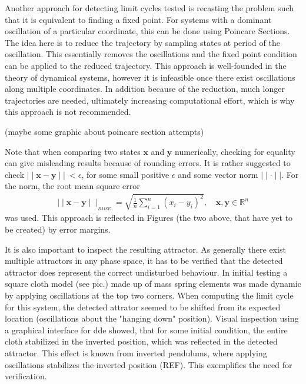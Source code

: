 Another approach for detecting limit cycles tested is recasting the problem such that it is equivalent to finding a fixed point. For systems with a dominant oscillation of a particular coordinate, this can be done using Poincare Sections. The idea here is to reduce the trajectory by sampling states at period of the oscillation. This essentially removes the oscillations and the fixed point condition can be applied to the reduced trajectory. This approach is well-founded in the theory of dynamical systems, however it is infeasible once there exist oscillations along multiple coordinates. In addition because of the reduction, much longer trajectories are needed, ultimately increasing computational effort, which is why this approach is not recommended. 

(maybe some graphic about poincare section attempts)

Note that when comparing two states $\mathbf{x}$ and $\mathbf{y}$ numerically, checking for equality can give misleading results because of rounding errors. It is rather suggested to check $\mid\mid \mathbf{x} - \mathbf{y} \mid\mid\ < \epsilon$, for some small positive $\epsilon$ and some vector norm $\mid\mid\cdot\mid\mid$. For the norm, the root mean square error \begin{gather}\mid\mid \mathbf{x} - \mathbf{y} \mid\mid_{_{RMSE}} = \sqrt{\frac{1}{n}\sum_{i=1}^{n}(x_i-y_i)^2},\quad \mathbf{x},\mathbf{y} \in \mathbb{R}^n\end{gather}was used. This approach is reflected in Figures (the two above, that have yet to be created) by error margins. 

It is also important to inspect the resulting attractor. As generally there exist multiple attractors in any phase space, it has to be verified that the detected attractor does represent the correct undisturbed behaviour. In initial testing a square cloth model (see pic.) made up of mass spring elements was made dynamic by applying oscillations at the top two corners. When computing the limit cycle for this system, the detected attrator seemed to be shifted from its expected location (oscillations about the "hanging down" position). Visual inspection using a graphical interface for dde showed, that for some initial condition, the entire cloth stabilized in the inverted position, which was reflected in the detected attractor. This effect is known from inverted pendulums, where applying oscillations stabilizes the inverted position (REF). This exemplifies the need for verification.  

